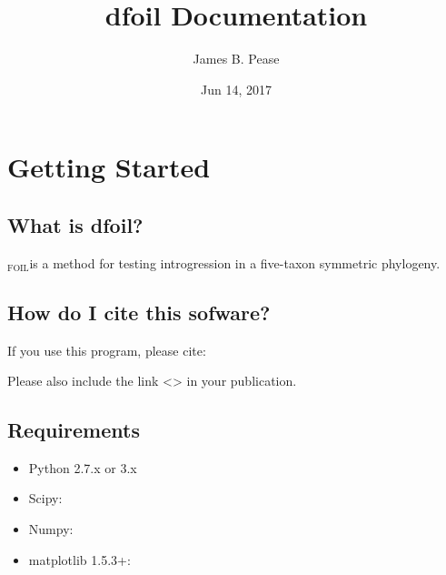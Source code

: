 \documentclass[letterpaper,12pt,english]{sphinxmanual}
\title{dfoil Documentation}
\date{Jun 14, 2017}
\author{James B. Pease}
\begin{document}
\maketitle
\sphinxtableofcontents
{}\label{\detokenize{index::doc}}



\chapter{Getting Started}
\label{\detokenize{intro::doc}}\label{\detokenize{intro:welcome-to-dfoil-s-documentation}}\label{\detokenize{intro:getting-started}}

\section{What is dfoil?}
\label{\detokenize{intro:what-is-dfoil}}
$_{\text{FOIL}}$is a method for testing introgression in a five-taxon symmetric phylogeny.


\section{How do I cite this sofware?}
\label{\detokenize{intro:how-do-i-cite-this-sofware}}
If you use this program, please cite:


Please also include the link \textless{}\textgreater{} in your publication.


\section{Requirements}
\label{\detokenize{intro:requirements}}\begin{itemize}
\item {} 
Python 2.7.x or 3.x

\item {} 
Scipy: 

\item {} 
Numpy: 

\item {} 
matplotlib 1.5.3+: 

\end{itemize}
\end{document}
